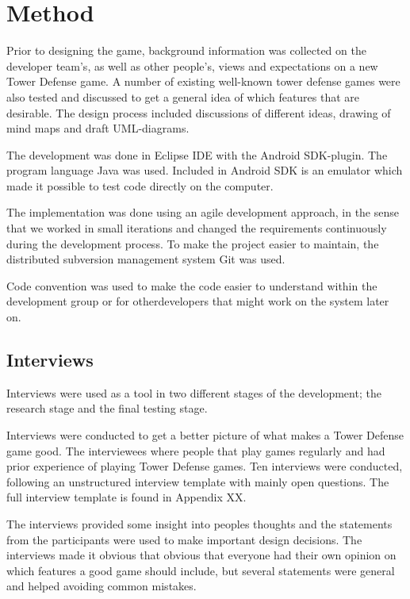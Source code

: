\chapter{Method}

Prior to designing the game, background information was collected on the developer team's, as well as other people's, views and expectations on a new Tower Defense game. A number of existing well-known tower defense games were also tested and discussed to get a general idea of which features that are desirable. The design process included discussions of different ideas, drawing of mind maps and draft UML-diagrams.

The development was done in Eclipse IDE with the Android SDK-plugin. The program language Java was used. Included in Android SDK is an emulator which made it possible to test code directly on the computer.

The implementation was done using an agile development approach, in the sense that we worked in small iterations and changed the requirements continuously during the development process. To make the project easier to maintain, the distributed subversion management system Git was used.

Code convention was used to make the code easier to understand within the development group or for otherdevelopers that might work on the system later on. 

\section{Interviews}

Interviews were used as a tool in two different stages of the development; the research stage and the final testing stage.

Interviews were conducted to get a better picture of what makes a Tower Defense game good. The interviewees where people that play games regularly and had prior experience of playing Tower Defense games. Ten interviews were conducted, following an unstructured interview template with mainly open questions. The full interview template is found in Appendix XX. 

The interviews provided some insight into peoples thoughts and the statements from the participants were used to make important design decisions. The interviews made it obvious that obvious that everyone had their own opinion on which features a good game should include, but several statements were general and helped avoiding common mistakes. 

